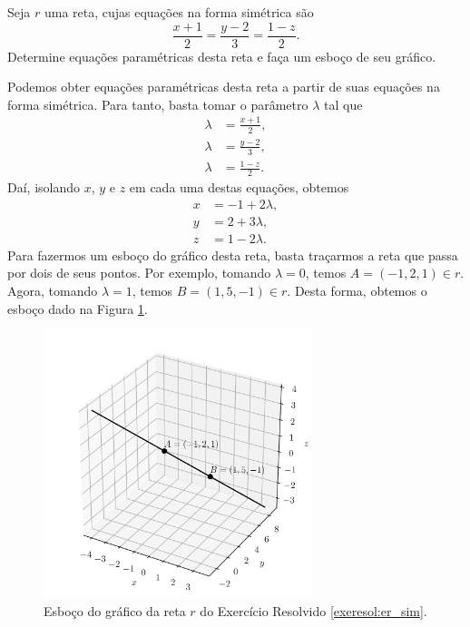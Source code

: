 \begin{exeresol}\label{exeresol:er_sim}
  Seja $r$ uma reta, cujas equações na forma simétrica são
  \begin{equation}
    \frac{x+1}{2} = \frac{y-2}{3} = \frac{1-z}{2}.
  \end{equation}
  Determine equações paramétricas desta reta e faça um esboço de seu gráfico.
\end{exeresol}
\begin{resol}
  Podemos obter equações paramétricas desta reta a partir de suas equações na forma simétrica. Para tanto, basta tomar o parâmetro $\lambda$ tal que
  \begin{align}
    \lambda &= \frac{x+1}{2},\\
    \lambda &= \frac{y-2}{3},\\
    \lambda &= \frac{1-z}{2}.
  \end{align}
  Daí, isolando $x$, $y$ e $z$ em cada uma destas equações, obtemos
  \begin{align}
    x &= -1 + 2\lambda,\\
    y &= 2 + 3\lambda,\\
    z &= 1 - 2\lambda.
  \end{align}
  Para fazermos um esboço do gráfico desta reta, basta traçarmos a reta que passa por dois de seus pontos. Por exemplo, tomando $\lambda = 0$, temos $A = (-1,2,1)\in r$. Agora, tomando $\lambda = 1$, temos $B = (1,5,-1)\in r$. Desta forma, obtemos o esboço dado na Figura \ref{fig:exeresol_er_sim}.

  \begin{figure}[H]
    \centering
    \includegraphics[width=0.7\textwidth]{./cap_er/dados/fig_exeresol_er_sim/fig_exeresol_er_sim}
    \caption{Esboço do gráfico da reta $r$ do Exercício Resolvido \ref{exeresol:er_sim}.}
    \label{fig:exeresol_er_sim}
  \end{figure}
\end{resol}